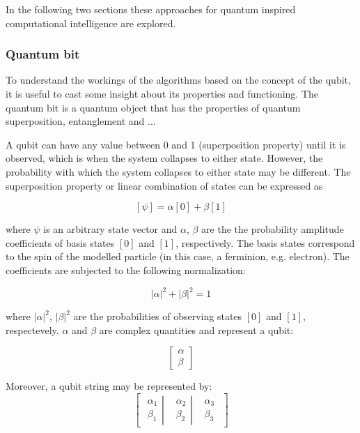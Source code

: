 In the following two sections these approaches for quantum inspired computational intelligence are explored.

\subsubsection{Quantum bit}

To understand the workings of the algorithms based on the concept of the \gls{qubit}, it is useful to cast some insight about its properties and functioning.
The quantum bit is a quantum object that has the properties of quantum superposition, entanglement and ...


A qubit can have any value between 0 and 1 (superposition property) until it is observed, which is when the system collapses to either state. However, the probability with which the system collapses to either state  may be different. The superposition property or linear combination of states can be expressed as

$$
[\psi] = \alpha[0] + \beta[1]
$$

where $\psi$ is an arbitrary state vector and $\alpha$, $\beta$ are the the probability amplitude coefficients of basis states $[0]$ and $[1]$, respectively. The basis states correspond to the spin of the modelled particle (in this case, a ferminion, e.g. electron). The coefficients are subjected to the following normalization:

$$|\alpha|^2 + |\beta|^2 = 1$$

where $|\alpha|^2$, $|\beta|^2$ are the probabilities of observing states $[0]$ and $[1]$, respectevely. $\alpha$ and $\beta$ are complex quantities and represent a qubit:

$$\begin{bmatrix}
\alpha \\
\beta
\end{bmatrix}$$

Moreover, a qubit string may be represented by:
$$
\begin{bmatrix}
\left.\begin{matrix}
\alpha_1\\ 
\beta_1
\end{matrix}\right| & \left.\begin{matrix}
\alpha_2\\ 
\beta_2
\end{matrix}\right| & \begin{matrix}
\alpha_3\\ 
\beta_3
\end{matrix}
\end{bmatrix}
$$

